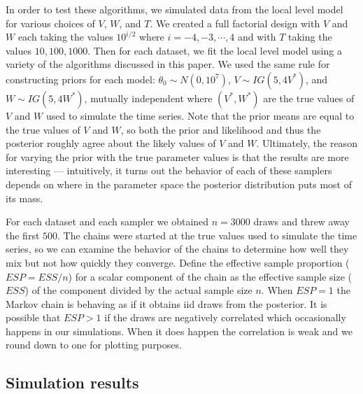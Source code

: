 \documentclass[12pt]{article}
\begin{document}
In order to test these algorithms, we simulated data from the local level model for various choices of $V$, $W$, and $T$. We created a full factorial design with $V$ and $W$ each taking the values $10^{i/2}$ where $i=-4,-3,\cdots,4$ and with $T$ taking the values $10, 100, 1000$. Then for each dataset, we fit the local level model using a variety of the algorithms discussed in this paper. We used the same rule for constructing priors for each model: $\theta_0\sim N(0,10^7)$, $V\sim IG(5, 4V^*)$, and $W\sim IG(5, 4W^*)$, mutually independent where $(V^*,W^*)$ are the true values of $V$ and $W$ used to simulate the time series. Note that the prior means are equal to the true values of $V$ and $W$, so both the prior and likelihood and thus the posterior roughly agree about the likely values of $V$ and $W$. Ultimately, the reason for varying the prior with the true parameter values is that the results are more interesting --- intuitively, it turns out the behavior of each of these samplers depends on where in the parameter space the posterior distribution puts most of its mass.

For each dataset and each sampler we obtained $n=3000$ draws and threw away the first $500$. The chains were started at the true values used to simulate the time series, so we can examine the behavior of the chains to determine how well they mix but not how quickly they converge. Define the effective sample proportion ($ESP=ESS/n$) for a scalar component of the chain as the effective sample size ($ESS$) \citep{gelman2013bayesian} of the component divided by the actual sample size $n$. When $ESP=1$ the Markov chain is behaving as if it obtains iid draws from the posterior. It is possible that $ESP>1$ if the draws are negatively correlated which occasionally happens in our simulations. When it does happen the correlation is weak and we round down to one for plotting purposes.

\subsection{Simulation results}
\end{document}
